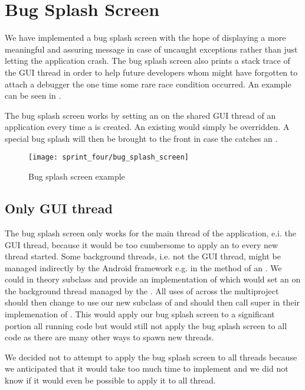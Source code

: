
\section{Bug Splash Screen}
\label{sec:bug_splash_screen}

We have implemented a bug splash screen with the hope of displaying a more meaningful and assuring message in case of uncaught exceptions rather than just letting the application crash. The bug splash screen also prints a stack trace of the GUI thread in order to help future developers whom might have forgotten to attach a debugger the one time some rare race condition occurred. An example can be seen in .

The bug splash screen works by setting an  on the shared GUI thread of an application every time a  is created. An existing  would simply be overridden. A special bug splash  will then be brought to the front in case the  catches an .

\begin{figure}[!htbp]
        \centering
        \texttt{[image: sprint\_four/bug\_splash\_screen]}
        \caption{Bug splash screen example}
        \label{fig:bug_splash_screen_example}
\end{figure}

\subsection{Only GUI thread} 
The bug splash screen only works for the main thread of the application, e.i. the GUI thread, because it would be too cumbersome to apply an  to every new thread started. Some background threads, i.e. not the GUI thread, might be managed indirectly by the Android framework e.g. in the  method of an . We could in theory subclass  and provide an implementation of  which would set an  on the background thread managed by the . All uses of  across the \giraf multiproject should then change to use our new subclass of  and should then call super in their implemenation of . This would apply our bug splash screen to a significant portion all running code but would still not apply the bug splash screen to all code as there are many other ways to spawn new threads. 

We decided not to attempt to apply the bug splash screen to all threads because we anticipated that it would take too much time to implement and we did not know if it would even be possible to apply it to all thread.          
